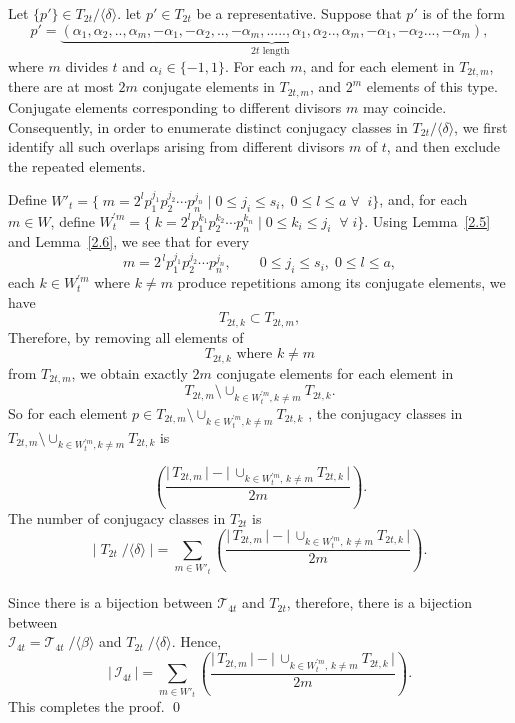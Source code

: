 \documentclass[a4paper,12pt]{amsart}
\renewenvironment{proof}{{\bfseries Proof.}}{\qed}
\numberwithin{equation}{section}
\theoremstyle{definition}
\newcommand{\lemref}[1]{Lemma~\ref{#1}}
\numberwithin{equation}{section}
\begin{document}
\begin{proof}
 Let $\{p'\}\in T_{2t}/\langle\delta\rangle$. let $p' \in T_{2t}$ be a representative. Suppose that $p'$ is of the form $$ p' = \underbrace{\scriptstyle (\alpha_1,\alpha_2,..,\alpha_m,-\alpha_1, -\alpha_2,.., -\alpha_m,.....,\alpha_1, \alpha_2..,\alpha_m,-\alpha_1, -\alpha_2..., -\alpha_m)}_{2t \text{ length }},$$ where $m$ divides $t$ and $\alpha_i \in \{-1,1\}.$ For each $m$, and for each element in $T_{2t,m}$, there are at most $2m$ conjugate elements in $T_{2t,m}$, and $2^m$ elements of this type. Conjugate elements corresponding to different divisors $m$ may coincide. Consequently, in order to enumerate distinct conjugacy classes in $T_{2t}/\langle \delta \rangle$,  we first identify all such overlaps arising
 from different divisors $m$ of $t$, and then exclude the repeated elements.

Define $W'_t= \{\;m = 2^{l}p_1^{j_1}p_2^{j_2}\cdots p_n^{j_n}\mid 0\leq j_i \leq s_i, \;0\leq l\leq a\;\forall\;\; i\}$, and, for each $m \in W$, define $W_{t}^{'m}= \{ \;k = 2^{l}p_1^{k_1}p_2^{k_2}\cdots p_n^{k_n}\mid 0\leq k_i \leq j_i \;\;\forall \; i\}.$ Using \lemref{2.5} and \lemref{2.6}, we see that for every 
\[
m = 2^{\,l} p_1^{j_1} p_2^{j_2} \cdots p_n^{j_n},
\qquad 0 \le j_i \le s_i,\; 0 \le l \le a,
\]
each $k \in W_{t}^{'m}$ where $k\neq m$  produce repetitions among its conjugate elements, we have
\[
T_{2t,k} \subset 
T_{2t,m},
\]
Therefore, by removing all elements of 
\[
T_{2t,k} \text{ where }  k \neq m
\]
from $T_{2t,m}$, we obtain exactly $2m$ conjugate elements for each element in 
\[
T_{2t,m} \setminus \cup _{k\in W_t^{'m}, k \neq m}T_{2t,k}.
\]
So for each element $p \in T_{2t,m} \setminus
\cup _{k\in W_t^{'m}, k \neq m}T_{2t,k}$ , the conjugacy classes in $T_{2t,m} \setminus
\cup _{k\in W_t^{'m}, k \neq m}T_{2t,k}$ is 

$$ \left ( \frac{\lvert\, T_{2t,m} \,\rvert- \lvert \,\cup_{k\in W_t^{'m},\, k\neq m}T_{2t,k}\,\rvert}{2m}\right).$$ 
The number of conjugacy classes in $T_{2t}$ is $$ \lvert\; T_{2t} \;/ \langle\delta\rangle\;\rvert = \sum_{m \in W'_t} \left ( \frac{\lvert \,T_{2t,m}\, \rvert- \lvert\, \cup_{k\in W_t^{'m},\, k\neq m}T_{2t,k}\,\rvert}{2m}\right).$$ \\Since there is a bijection between $\mathcal{T}_{4t}$ and $T_{2t}$, therefore, there is a bijection between \\$\mathscr{I}_{4t}=\mathcal{T}_{4t}\;/\langle\beta\rangle$ and $T_{2t} \;/ \langle\delta\rangle$. Hence, 
$$  \lvert \,\mathscr{I}_{4t}\,\rvert = \sum_{m \in W'_t} \left (\frac{\lvert\, T_{2t,m} \,\rvert- \lvert\, \cup_{k\in W_t^{'m},\, k\neq m}T_{2t,k}\,\rvert}{2m}\right).$$  
This completes the proof. 
\end{proof}
\end{document}
